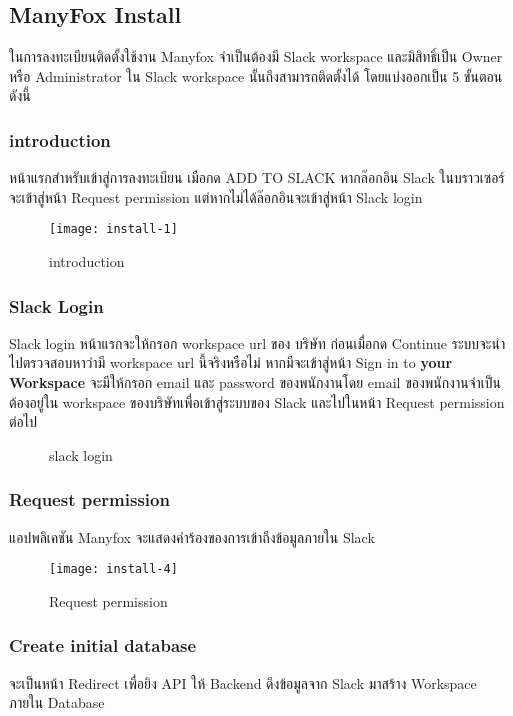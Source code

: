 \subsection{ManyFox Install}
ในการลงทะเบียนติดตั้งใช้งาน Manyfox จำเป็นต้องมี Slack workspace และมิสิทธิ์เป็น Owner หรือ Administrator ใน Slack workspace นั้นถึงสามารถติดตั้งได้
โดยแบ่งออกเป็น 5 ขั้นตอนดังนี้
\subsubsection{introduction}
หน้าแรกสำหรับเข้าสู่การลงทะเบียน เมือกด ADD TO SLACK หากล๊อกอิน Slack ในบราวเซอร์
จะเข้าสู่หน้า Request permission แต่หากไม่ได้ล๊อกอินจะเข้าสู่หน้า Slack login
\begin{figure}[!htbp]
	\centering
	\texttt{[image: install-1]}
	\caption{introduction}
	\label{Fig:introduction}
\end{figure}
\subsubsection{Slack Login}
Slack login หน้าแรกจะให้กรอก workspace url ของ บริษัท ก่อนเมื่อกด Continue
ระบบจะนำไปตรวจสอบหาว่ามี workspace url นี้จริงหรือไม่ หากมีจะเข้าสู่หน้า Sign in to { \textbf{your Workspace} }
จะมีให้กรอก email และ password ของพนักงานโดย email ของพนักงานจำเป็นต้องอยู่ใน
workspace ของบริษัทเพื่อเข้าสู่ระบบของ Slack และไปในหน้า Request permission ต่อไป
\begin{figure}[!htbp]
	\centering
	\caption{slack login}

\end{figure}
\subsubsection{Request permission}
แอปพลิเคชัน Manyfox จะแสดงคำร้องของการเข้าถึงข้อมูลภายใน Slack
\begin{figure}[!htbp]
	\centering
	\texttt{[image: install-4]}
	\caption{Request permission}
	\label{Fig:permission}
\end{figure}
\subsubsection{Create initial database}
จะเป็นหน้า Redirect เพื่อยิง API ให้ Backend ดึงข้อมูลจาก Slack มาสร้าง Workspace ภายใน Database
